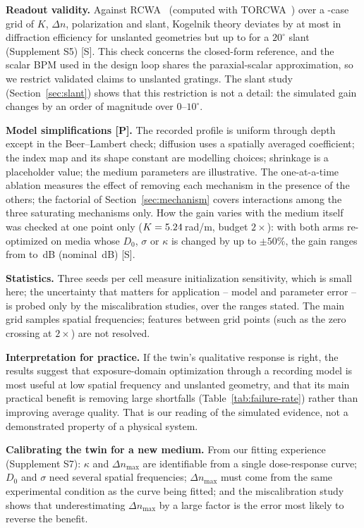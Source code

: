 \documentclass{optica-article}
\begin{document}
\textbf{Readout validity.} Against RCWA~\cite{moharam1981rigorous}
(computed with TORCWA~\cite{kim2023torcwa}) over a \RCWAVGridNCases-case grid
of $K$, $\Delta n$, polarization and slant, Kogelnik theory deviates by at
most \RCWAUnslantedMaxDev{} in diffraction efficiency for unslanted
geometries but up to \RCWAVGridMaxDev{} for a $20^\circ$ slant (Supplement
S5) [S]. This check concerns the closed-form reference, and the scalar BPM
used in the design loop shares the paraxial-scalar approximation, so we
restrict validated claims to unslanted gratings. The slant study
(Section~\ref{sec:slant}) shows that this restriction is not a detail: the
simulated gain changes by an order of magnitude over $0$--$10^\circ$.

\textbf{Model simplifications [P].} The recorded profile is uniform through
depth except in the Beer--Lambert check; diffusion uses a spatially averaged
coefficient; the index map and its shape constant are modelling choices;
shrinkage is a placeholder value; the medium parameters are illustrative.
The one-at-a-time ablation measures the effect of removing each mechanism in
the presence of the others; the factorial of Section~\ref{sec:mechanism}
covers interactions among the three saturating mechanisms only. How the
gain varies with the medium itself was checked at one point only
($K=5.24$\,rad/\textmu m, budget $2\times$): with both arms
re-optimized on media whose $D_0$, $\sigma$ or $\kappa$ is changed by up to
$\pm50\%$, the gain ranges from \STwoGainMin{} to \STwoGainMax\,dB
(nominal \STwoBaselineGain\,dB) [S].

\textbf{Statistics.} Three seeds per cell measure initialization sensitivity,
which is small here; the uncertainty that matters for application --
model and parameter error -- is probed only by the miscalibration studies,
over the ranges stated. The main grid samples \MOneNK{} spatial frequencies;
features between grid points (such as the zero crossing at $2\times$) are
not resolved.

\textbf{Interpretation for practice.} If the twin's qualitative response
is right, the results suggest that exposure-domain optimization through a
recording model is most useful at low spatial frequency and unslanted
geometry, and that its main practical benefit is removing large shortfalls
(Table~\ref{tab:failure-rate}) rather than improving average quality. That
is our reading of the simulated evidence, not a demonstrated property of a
physical system.

\textbf{Calibrating the twin for a new medium.} From our fitting experience
(Supplement S7): $\kappa$ and $\Delta n_{\max}$ are identifiable from a single
dose-response curve; $D_0$ and $\sigma$ need several spatial frequencies;
$\Delta n_{\max}$ must come from the same experimental condition as the curve
being fitted; and the miscalibration study shows that underestimating
$\Delta n_{\max}$ by a large factor is the error most likely to reverse the
benefit.
\end{document}
